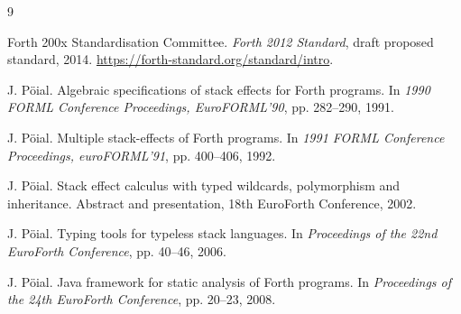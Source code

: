 \documentclass[a4paper,10pt]{article}
\begin{document}
\begin{thebibliography}{9}
\small
\raggedright

Forth 200x Standardisation Committee.
\newblock \emph{Forth 2012 Standard}, draft proposed standard, 2014.
\newblock \url{https://forth-standard.org/standard/intro}.

J. Pöial.
\newblock Algebraic specifications of stack effects for Forth programs.
\newblock In \emph{1990 FORML Conference Proceedings, EuroFORML'90},
pp. 282--290, 1991.

J. Pöial.
\newblock Multiple stack-effects of Forth programs.
\newblock In \emph{1991 FORML Conference Proceedings, euroFORML'91},
pp. 400--406, 1992.

J. Pöial.
\newblock Stack effect calculus with typed wildcards, polymorphism and
inheritance.
\newblock Abstract and presentation, 18th EuroForth Conference, 2002.

J. Pöial.
\newblock Typing tools for typeless stack languages.
\newblock In \emph{Proceedings of the 22nd EuroForth Conference},
pp. 40--46, 2006.

J. Pöial.
\newblock Java framework for static analysis of Forth programs.
\newblock In \emph{Proceedings of the 24th EuroForth Conference},
pp. 20--23, 2008.

\end{thebibliography}
\end{document}

